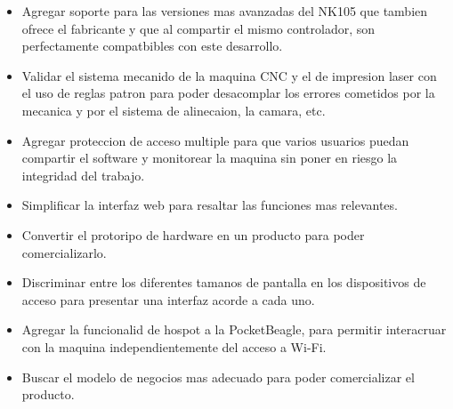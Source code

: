 \begin{itemize}
\item{Agregar soporte para las versiones mas avanzadas del NK105 que tambien ofrece el fabricante y que al compartir el mismo controlador, son perfectamente compatbibles con este desarrollo.}
\item{Validar el sistema mecanido de la maquina CNC y el de impresion laser con el uso de reglas patron para poder desacomplar los errores cometidos por la mecanica y por el sistema de alinecaion, la camara, etc.}
\item{Agregar proteccion de acceso multiple para que varios usuarios puedan compartir el software y monitorear la maquina sin poner en riesgo la integridad del trabajo.}
\item{Simplificar la interfaz web para resaltar las funciones mas relevantes.}
\item{Convertir el protoripo de hardware en un producto para poder comercializarlo.}
\item{Discriminar entre los diferentes tamanos de pantalla en los dispositivos de acceso para presentar una interfaz acorde a cada uno.}
\item{Agregar la funcionalid de hospot a la PocketBeagle, para permitir interacruar con la maquina independientemente del acceso a Wi-Fi.}
\item{Buscar el modelo de negocios mas adecuado para poder comercializar el producto.}
\end{itemize}
